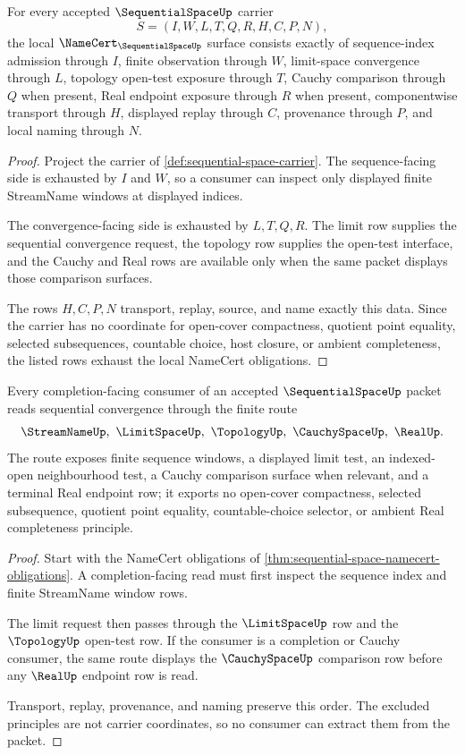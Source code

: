 \begin{theorem}
\label{thm:sequential-space-namecert-obligations}
For every accepted $\SequentialSpaceUp$ carrier
$$
S=(I,W,L,T,Q,R,H,C,P,N),
$$
the local $\NameCert_{\SequentialSpaceUp}$ surface consists exactly of sequence-index admission through $I$, finite observation through $W$, limit-space convergence through $L$, topology open-test exposure through $T$, Cauchy comparison through $Q$ when present, Real endpoint exposure through $R$ when present, componentwise transport through $H$, displayed replay through $C$, provenance through $P$, and local naming through $N$.
\end{theorem}
\begin{proof}
Project the carrier of \autoref{def:sequential-space-carrier}. The sequence-facing side is exhausted by $I$ and $W$, so a consumer can inspect only displayed finite StreamName windows at displayed indices.

The convergence-facing side is exhausted by $L,T,Q,R$. The limit row supplies the sequential convergence request, the topology row supplies the open-test interface, and the Cauchy and Real rows are available only when the same packet displays those comparison surfaces.

The rows $H,C,P,N$ transport, replay, source, and name exactly this data. Since the carrier has no coordinate for open-cover compactness, quotient point equality, selected subsequences, countable choice, host closure, or ambient completeness, the listed rows exhaust the local NameCert obligations.
\end{proof}

\begin{theorem}
\label{thm:sequential-space-completion-facing-route}
Every completion-facing consumer of an accepted $\SequentialSpaceUp$ packet reads sequential convergence through the finite route
$$
\StreamNameUp,\ \LimitSpaceUp,\ \TopologyUp,\ \CauchySpaceUp,\ \RealUp .
$$
The route exposes finite sequence windows, a displayed limit test, an indexed-open neighbourhood test, a Cauchy comparison surface when relevant, and a terminal Real endpoint row; it exports no open-cover compactness, selected subsequence, quotient point equality, countable-choice selector, or ambient Real completeness principle.
\end{theorem}
\begin{proof}
Start with the NameCert obligations of \autoref{thm:sequential-space-namecert-obligations}. A completion-facing read must first inspect the sequence index and finite StreamName window rows.

The limit request then passes through the $\LimitSpaceUp$ row and the $\TopologyUp$ open-test row. If the consumer is a completion or Cauchy consumer, the same route displays the $\CauchySpaceUp$ comparison row before any $\RealUp$ endpoint row is read.

Transport, replay, provenance, and naming preserve this order. The excluded principles are not carrier coordinates, so no consumer can extract them from the packet.
\end{proof}

